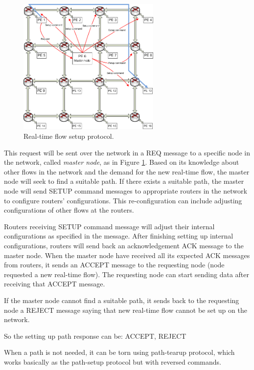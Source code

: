 \documentclass[conference, twocolumn]{IEEEtran}
\theoremstyle{definition}
\begin{document}
\begin{figure}[htp]
\centering
\includegraphics[width=7cm]{pics/Protocol2}
\caption[Setup request for a real-time flow.]
{Real-time flow setup protocol.}\label{fig:ReqSetup}
\end{figure}

This request will be sent over the network in a REQ message to a specific node
in the network, called {\em master node}, as in Figure \ref{fig:ReqSetup}.
Based on its knowledge about other flows in the network and the demand for the
new real-time flow, the master node will seek to find a suitable path. If there
exists a suitable path, the master node will send SETUP command messages to
appropriate routers in the network to configure routers' configurations. This
re-configuration can include adjusting configurations of other flows at the routers.

Routers receiving SETUP command message will adjust their internal
configurations as specified in the message. After finishing setting up internal
configurations, routers will send back an acknowledgement ACK message to
the master node. When the master node have received all its expected ACK
messages from routers, it sends an ACCEPT message to the requesting node
(node requested a new real-time flow). The requesting node can start sending
data after receiving that ACCEPT message.

If the master node cannot find a suitable path, it sends back to the requesting
node a REJECT message saying that new real-time flow cannot be set up on the
network.

So the setting up path response can be: ACCEPT, REJECT

When a path is not needed, it can be torn using path-tearup protocol, which
works basically as the path-setup protocol but with reversed commands.
\end{document}
